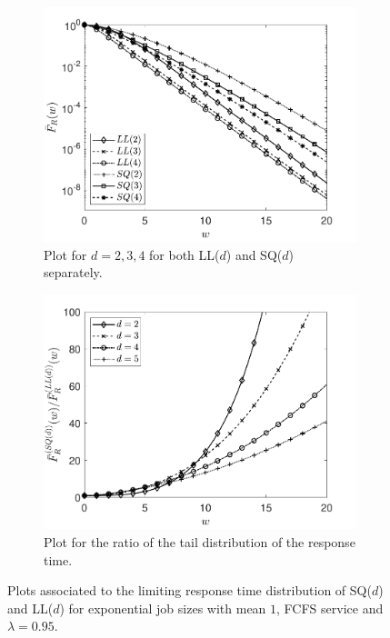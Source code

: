 \documentclass[12pt]{report}
\begin{document}
\begin{figure}[t]
\begin{center}
\begin{subfigure}{0.45\textwidth}
\centering
\captionsetup{width=.8\linewidth}
\includegraphics[width=1\linewidth]{figures/Chapter2/fig3_3a.pdf}
\caption{ Plot for $d=2,3,4$ for both LL($d$) and SQ($d$) separately. }
\label{fig3.3a}
\end{subfigure}
\begin{subfigure}{.45\textwidth}
\centering
\captionsetup{width=.8\linewidth}
\includegraphics[width=1\linewidth]{figures/Chapter2/fig3_3b.pdf}
\caption{ Plot for the ratio of the tail distribution of the response time.}
\label{fig3.3b}
\end{subfigure}
\caption{Plots associated to the limiting response time distribution of SQ($d$) and LL($d$) for exponential job
sizes with mean $1$, FCFS service and $\lambda = 0.95$.}
\label{fig3.3}
\end{center}
\end{figure}
\end{document}
